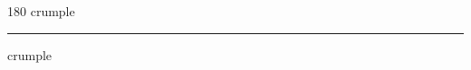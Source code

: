 
\begin{frame}
\begin{center}
\begin{turn}{180}
{\fontsize{2.5cm}{1em}\selectfont crumple}
\end{turn}
\vspace{1em}\par  
\hrule
\vspace{1em}\par  
{\fontsize{2.5cm}{1em}\selectfont crumple}
\end{center}
\end{frame}
